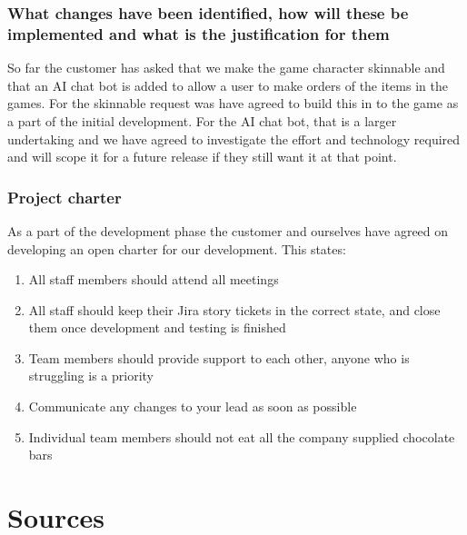 \documentclass{article}
\begin{document}
\subsubsection{What changes have been identified, how will these be implemented and what is the justification for them}
So far the customer has asked that we make the game character skinnable and that an AI chat bot is added to allow a user to make orders of the items in the games.
For the skinnable request was have agreed to build this in to the game as a part of the initial development.
For the AI chat bot, that is a larger undertaking and we have agreed to investigate the effort and technology required and will scope it for a future release if they still want it at that point.

\subsubsection{Project charter}
As a part of the development phase the customer and ourselves have agreed on developing an open charter for our development. This states:
\begin{enumerate}
    \item All staff members should attend all meetings
    \item All staff should keep their Jira story tickets in the correct state, and close them once development and testing is finished
    \item Team members should provide support to each other, anyone who is struggling is a priority
    \item Communicate any changes to your lead as soon as possible
    \item Individual team members should not eat all the company supplied chocolate bars
\end{enumerate}

\break
\section{Sources}
\end{document}

